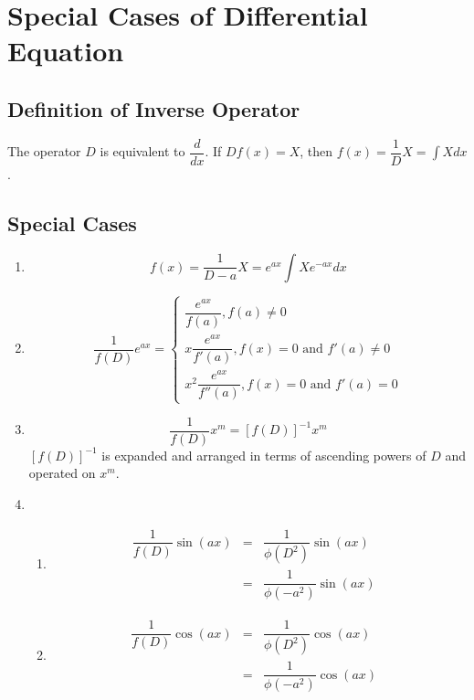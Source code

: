 \section{Special Cases of Differential Equation}
\subsection{Definition of Inverse Operator}
The operator $D$ is equivalent to $\dfrac{d}{dx}$. If $Df(x)=X$, then $f(x)=\dfrac{1}{D}X=\int X dx$.

\subsection{Special Cases}
\begin{enumerate}
	\item \begin{equation}f(x)=\dfrac{1}{D-a}X=e^{ax}\int Xe^{-ax}dx \end{equation}

	\item \begin{equation}\dfrac{1}{f(D)}e^{ax}=\begin{cases}
			\dfrac{e^{ax}}{f(a)}, f(a)\neq 0\\
			x\dfrac{e^{ax}}{f'(a)}, f(x)=0 \text{ and } f'(a)\neq 0\\
			x^2\dfrac{e^{ax}}{f''(a)}, f(x)=0 \text{ and } f'(a)= 0
		\end{cases}
	\end{equation}

	\item \begin{equation} \dfrac{1}{f(D)}x^m=[f(D)]^{-1} x^m \end{equation}
	$[f(D)]^{-1}$ is expanded and arranged in terms of ascending powers of $D$ and operated on $x^m$.

	\item \begin{enumerate}
		\item
		\begin{equation}
			\begin{aligned}
				\dfrac{1}{f(D)} \sin (ax) &=& \dfrac{1}{\phi(D^2)} \sin (ax)&\\ &=&\dfrac{1}{\phi(-a^2)} \sin (ax)
			\end{aligned}
		\end{equation}

		\item
		\begin{equation}
			\begin{aligned}
				\dfrac{1}{f(D)} \cos (ax) &=& \dfrac{1}{\phi(D^2)} \cos (ax)&\\ &=&\dfrac{1}{\phi(-a^2)} \cos (ax)
			\end{aligned}
		\end{equation}
	\end{enumerate}


\end{enumerate}
